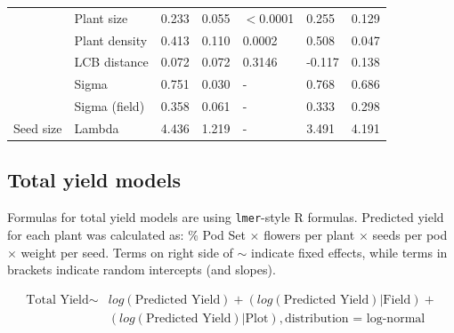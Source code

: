 \documentclass[12pt]{article} %
\begin{document}
\begin{longtable}{l|l|r|r|l|l|l}
\cline{2-7}
 & Plant size & 0.233 & 0.055 & $<$0.0001 & 0.255 & 0.129\\
\cline{2-7}
 & Plant density & 0.413 & 0.110 & 0.0002 & 0.508 & 0.047\\
\cline{2-7}
 & LCB distance & 0.072 & 0.072 & 0.3146 & -0.117 & 0.138\\
\cline{2-7}
 & Sigma & 0.751 & 0.030 & - & 0.768 & 0.686\\
\cline{2-7}
 & Sigma (field) & 0.358 & 0.061 & - & 0.333 & 0.298\\
\cline{2-7}
\multirow{-8}{*}{\raggedright\arraybackslash Seed size} & Lambda & 4.436 & 1.219 & - & 3.491 & 4.191\\
\hline
\end{longtable}
\endgroup{}


\clearpage

\subsection*{Total yield models}

Formulas for total yield models are  using \texttt{lmer}-style R formulas. Predicted yield for each plant was calculated as: \% Pod Set $\times$ flowers per plant $\times$ seeds per pod $\times$ weight per seed. Terms on right side of $\sim$ indicate fixed effects, while terms in brackets indicate random intercepts (and slopes). 

\begin{align*}
    \text{Total Yield} \sim & log(\text{Predicted Yield}) + (log(\text{Predicted Yield})|\text{Field}) + \\
    & (log(\text{Predicted Yield})|\text{Plot}), \text{distribution = log-normal} \\
\end{align*}
\end{document}
